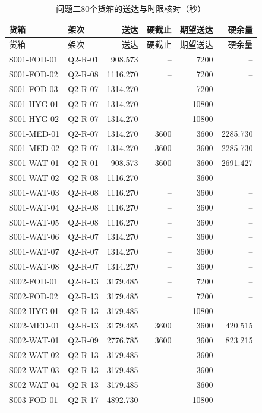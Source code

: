 \begin{longtable}{@{}llrrrr@{}}
\caption{问题二80个货箱的送达与时限核对（秒）}\label{tab:app_deliveries}\\
\toprule
货箱 & 架次 & 送达 & 硬截止 & 期望送达 & 硬余量\\
\midrule
\endfirsthead
\toprule
货箱 & 架次 & 送达 & 硬截止 & 期望送达 & 硬余量\\
\midrule
\endhead
S001-FOD-01 & Q2-R-01 & 908.573 & -- & 7200 & --\\
S001-FOD-02 & Q2-R-08 & 1116.270 & -- & 7200 & --\\
S001-FOD-03 & Q2-R-07 & 1314.270 & -- & 7200 & --\\
S001-HYG-01 & Q2-R-07 & 1314.270 & -- & 10800 & --\\
S001-HYG-02 & Q2-R-07 & 1314.270 & -- & 10800 & --\\
S001-MED-01 & Q2-R-07 & 1314.270 & 3600 & 3600 & 2285.730\\
S001-MED-02 & Q2-R-07 & 1314.270 & 3600 & 3600 & 2285.730\\
S001-WAT-01 & Q2-R-01 & 908.573 & 3600 & 3600 & 2691.427\\
S001-WAT-02 & Q2-R-08 & 1116.270 & -- & 3600 & --\\
S001-WAT-03 & Q2-R-08 & 1116.270 & -- & 3600 & --\\
S001-WAT-04 & Q2-R-08 & 1116.270 & -- & 3600 & --\\
S001-WAT-05 & Q2-R-08 & 1116.270 & -- & 3600 & --\\
S001-WAT-06 & Q2-R-07 & 1314.270 & -- & 3600 & --\\
S001-WAT-07 & Q2-R-07 & 1314.270 & -- & 3600 & --\\
S001-WAT-08 & Q2-R-07 & 1314.270 & -- & 3600 & --\\
S002-FOD-01 & Q2-R-13 & 3179.485 & -- & 7200 & --\\
S002-FOD-02 & Q2-R-13 & 3179.485 & -- & 7200 & --\\
S002-HYG-01 & Q2-R-13 & 3179.485 & -- & 10800 & --\\
S002-MED-01 & Q2-R-13 & 3179.485 & 3600 & 3600 & 420.515\\
S002-WAT-01 & Q2-R-09 & 2776.785 & 3600 & 3600 & 823.215\\
S002-WAT-02 & Q2-R-13 & 3179.485 & -- & 3600 & --\\
S002-WAT-03 & Q2-R-13 & 3179.485 & -- & 3600 & --\\
S002-WAT-04 & Q2-R-13 & 3179.485 & -- & 3600 & --\\
S003-FOD-01 & Q2-R-17 & 4892.730 & -- & 10800 & --\\

\end{longtable}

